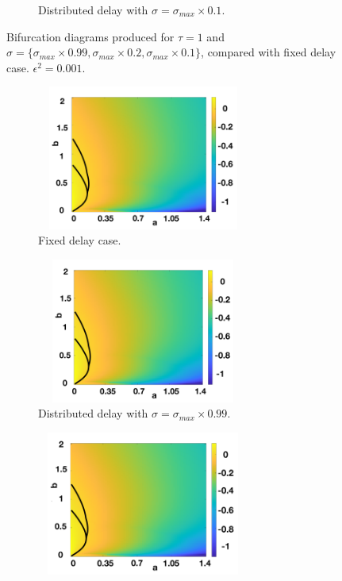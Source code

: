 \documentclass[12pt]{report}
\begin{document}
\begin{figure}[H]
\begin{subfigure}[b]{0.45\textwidth}
        \caption{Distributed delay with $\sigma=\sigma_{max}\times0.1$.}
        \label{}
    \end{subfigure}
    \caption{Bifurcation diagrams produced for $\tau=1$ and $\sigma=\{ \sigma_{max}\times0.99,\sigma_{max}\times0.2,\sigma_{max}\times0.1 \}$, compared with fixed delay case. $\epsilon^2=0.001$.}
    \label{fig:distbif2}
\end{figure}
\begin{figure}[H]
    \centering
    \begin{subfigure}[b]{0.45\textwidth}
        \centering
        \includegraphics[width=7cm,height=4.75cm]{distbif41.png}
        \caption{Fixed delay case.}
        \label{}
    \end{subfigure}
    \hfill
    \begin{subfigure}[b]{0.45\textwidth}
        \centering
        \includegraphics[width=7cm,height=4.75cm]{distbif42.png}
        \caption{Distributed delay with $\sigma=\sigma_{max}\times0.99$.}
        \label{}
    \end{subfigure}
    \hfill
    \begin{subfigure}[b]{0.45\textwidth}
        \centering
        \includegraphics[width=7cm,height=4.75cm]{distbif43.png}

\end{subfigure}
\end{figure}
\end{document}
